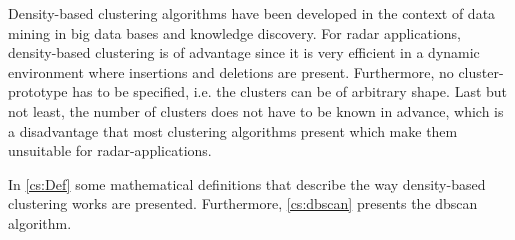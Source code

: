 Density-based clustering algorithms have been developed in the context of data mining in big data bases and knowledge discovery. For radar applications, density-based clustering is of advantage since it is very efficient in a dynamic environment where insertions and deletions are present. Furthermore, no cluster-prototype has to be specified, i.e. the clusters can be of arbitrary shape. Last but not least, the number of clusters does not have to be known in advance, which is a disadvantage that most clustering algorithms present which make them unsuitable for radar-applications. 

In \cref{cs:Def} some mathematical definitions that describe the way density-based clustering works are presented. Furthermore, \cref{cs:dbscan} presents the \ac{dbscan} algorithm.
